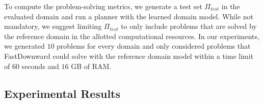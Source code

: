 \documentclass[letterpaper]{article} %
\newcommand{\T}{T}
\newcommand{\Ttrain}{\T_{train}}
\newcommand{\Ttest}{\T_{test}}
\newcommand{\stest}{\ensuremath{S_{\textit{test}}}\xspace}
\newcommand{\ptest}{\ensuremath{\Pi_{\textit{test}}}\xspace}
\newif\ifaddcomments
\newcommand{\roni}[1]{\ifaddcomments{\textcolor{red}{[Roni: #1]}}\fi}
\newcommand{\leo}[1]{\ifaddcomments{\textcolor{pink}{[Leonardo: #1]}}\fi}
\begin{document}
%
To compute the problem-solving metrics, we generate a test set \ptest in the evaluated domain and run a planner with the learned domain model. 
While not mandatory, we suggest limiting \ptest to only include problems that are solved by the reference domain in the allotted computational resources. 
In our experiments, we generated $10$ problems for every domain and only considered problems that FastDownward could solve with the reference domain model within a time limit of $60$ seconds and $16$ GB of RAM. %





%


\subsection{Experimental Results}
% 
% 
% 
% 

\end{document}
